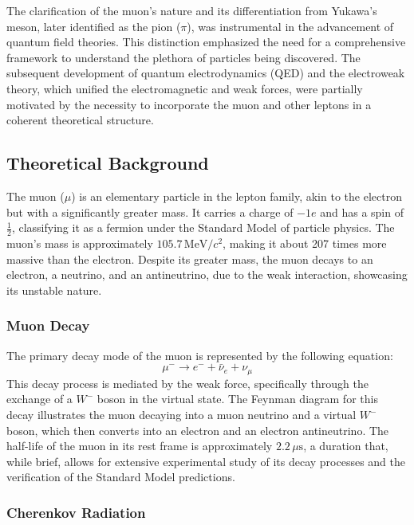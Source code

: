 \documentclass[10pt,letterpaper,onecolumn]{article}
\begin{document}
The clarification of the muon's nature and its differentiation from Yukawa's meson, later identified as the pion ($\pi$), was instrumental in the advancement of quantum field theories. This distinction emphasized the need for a comprehensive framework to understand the plethora of particles being discovered. The subsequent development of quantum electrodynamics (QED) and the electroweak theory, which unified the electromagnetic and weak forces, were partially motivated by the necessity to incorporate the muon and other leptons in a coherent theoretical structure. \cite{MuonG2Experiment2004}
\subsection{Theoretical Background}

The muon ($\mu$) is an elementary particle in the lepton family, akin to the electron but with a significantly greater mass. It carries a charge of $-1e$ and has a spin of $\frac{1}{2}$, classifying it as a fermion under the Standard Model of particle physics. The muon's mass is approximately $105.7 \, \text{MeV}/c^2$, making it about 207 times more massive than the electron. Despite its greater mass, the muon decays to an electron, a neutrino, and an antineutrino, due to the weak interaction, showcasing its unstable nature.

\subsubsection{Muon Decay}

The primary decay mode of the muon is represented by the following equation:
\[
\mu^- \rightarrow e^- + \bar{\nu}_e + \nu_\mu
\]
This decay process is mediated by the weak force, specifically through the exchange of a $W^-$ boson in the virtual state. The Feynman diagram for this decay illustrates the muon decaying into a muon neutrino and a virtual $W^-$ boson, which then converts into an electron and an electron antineutrino. The half-life of the muon in its rest frame is approximately $2.2 \, \mu\text{s}$, a duration that, while brief, allows for extensive experimental study of its decay processes and the verification of the Standard Model predictions. \cite{Beringer2012Leptons}

\subsubsection{Cherenkov Radiation}
\end{document}
